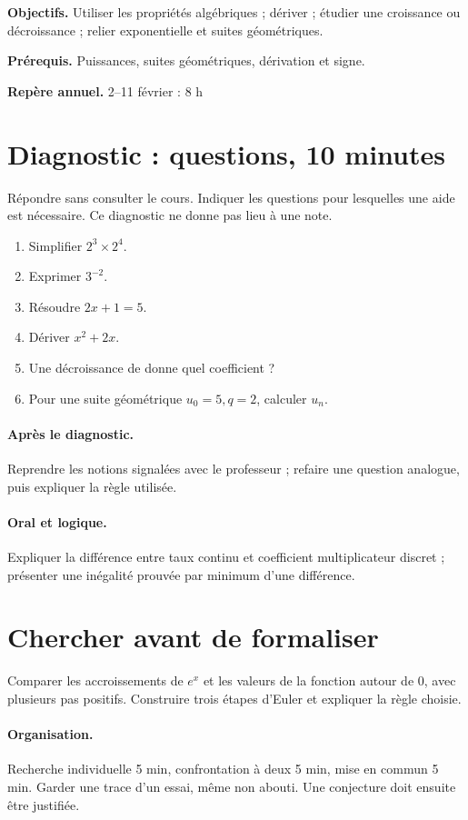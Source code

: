 \label{C09}
\begin{keypoint}
\textbf{Objectifs.} Utiliser les propriétés algébriques ; dériver ; étudier une croissance ou décroissance ; relier exponentielle et suites géométriques.

\textbf{Prérequis.} Puissances, suites géométriques, dérivation et signe.

\textbf{Repère annuel.} 2–11 février : 8 h\end{keypoint}
\section*{Diagnostic :  questions, 10 minutes}\label{C09-D}
Répondre sans consulter le cours. Indiquer les questions pour lesquelles une aide est nécessaire. Ce diagnostic ne donne pas lieu à une note.
\begin{enumerate}
\item Simplifier $2^3\times2^4$.
\item Exprimer $3^{-2}$.
\item Résoudre $2x+1=5$.
\item Dériver $x^2+2x$.
\item Une décroissance de  donne quel coefficient ?
\item Pour une suite géométrique $u_0=5,q=2$, calculer $u_n$.
\end{enumerate}
\paragraph{Après le diagnostic.} Reprendre les notions signalées avec le professeur ; refaire une question analogue, puis expliquer la règle utilisée.
\paragraph{Oral et logique.} Expliquer la différence entre taux continu et coefficient multiplicateur discret ; présenter une inégalité prouvée par minimum d’une différence.
\mxnewpage
\section*{Chercher avant de formaliser}\label{C09-RECH}
Comparer les accroissements de $e^x$ et les valeurs de la fonction autour de 0, avec plusieurs pas positifs. Construire trois étapes d’Euler et expliquer la règle choisie.
\paragraph{Organisation.} Recherche individuelle 5 min, confrontation à deux 5 min, mise en commun 5 min. Garder une trace d’un essai, même non abouti. Une conjecture doit ensuite être justifiée.
\mxnewpage
